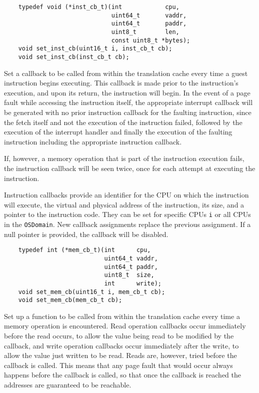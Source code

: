 \documentclass[letterpaper, 10pt]{book}
\begin{document}
\label{func:set_inst_cb} \begin{verbatim}
    typedef void (*inst_cb_t)(int            cpu, 
                              uint64_t       vaddr, 
                              uint64_t       paddr, 
                              uint8_t        len, 
                              const uint8_t *bytes);
    void set_inst_cb(uint16_t i, inst_cb_t cb);
    void set_inst_cb(inst_cb_t cb);
\end{verbatim}
Set a callback to be called from within the translation cache every time a 
guest instruction begins executing. This callback is made prior to the
instruction's execution, and upon its return, the instruction will begin. In
the event of a page fault while accessing the instruction itself, the
appropriate interrupt callback will be generated with no prior instruction
callback for the faulting instruction, since the fetch itself and not the
execution of the instruction failed, followed by the execution of the interrupt
handler and finally the execution of the faulting instruction including the 
appropriate instruction callback.

If, however, a memory operation that is part of the instruction execution
fails, the instruction callback will be seen twice, once for each attempt at
executing the instruction.

Instruction callbacks provide an identifier for the CPU on which the
instruction will execute, the virtual and physical address of the instruction,
its size, and a pointer to the instruction code. They can be set for specific
CPUs \texttt{i} or all CPUs in the \texttt{OSDomain}. New callback assignments
replace the previous assignment. If a null pointer is provided, the callback 
will be disabled.

\label{func:set_mem_cb} \begin{verbatim}
    typedef int (*mem_cb_t)(int      cpu,
                            uint64_t vaddr,
                            uint64_t paddr, 
                            uint8_t  size, 
                            int      write);
    void set_mem_cb(uint16_t i, mem_cb_t cb);
    void set_mem_cb(mem_cb_t cb);
\end{verbatim}
Set up a function to be called from within the translation cache every time a
memory operation is encountered. Read operation callbacks occur immediately
before the read occurs, to allow the value being read to be modified by the
callback, and write operation callbacks occur immediately after the write,
to allow the value just written to be read. Reads are, however, tried before
the callback is called. This means that any page fault that would occur always
happens before the callback is called, so that once the callback is reached
the addresses are guaranteed to be reachable.
\end{document}
